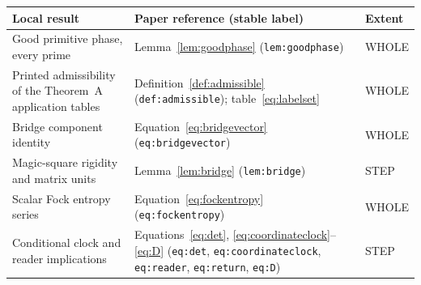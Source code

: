 \begin{center}\footnotesize
{}\label{tab:leancore}
\begin{tabular}{@{}>{\raggedright\arraybackslash}p{.36\linewidth}>{\raggedright\arraybackslash}p{.49\linewidth}>{\raggedright\arraybackslash}p{.09\linewidth}@{}}
\toprule Local result & Paper reference (stable label) & Extent\\\midrule
Good primitive phase, every prime & Lemma~\ref{lem:goodphase} (\texttt{lem:goodphase}) & WHOLE\\
Printed admissibility of the Theorem~A application tables & Definition~\ref{def:admissible} (\texttt{def:admissible}); table~\eqref{eq:labelset} & WHOLE\\
Bridge component identity & Equation~\eqref{eq:bridgevector} (\texttt{eq:bridgevector}) & WHOLE\\
Magic-square rigidity and matrix units & Lemma~\ref{lem:bridge} (\texttt{lem:bridge}) & STEP\\
Scalar Fock entropy series & Equation~\eqref{eq:fockentropy} (\texttt{eq:fockentropy}) & WHOLE\\
Conditional clock and reader implications & Equations~\eqref{eq:det}, \eqref{eq:coordinateclock}--\eqref{eq:D} (\texttt{eq:det}, \texttt{eq:coordinateclock}, \texttt{eq:reader}, \texttt{eq:return}, \texttt{eq:D}) & STEP\\
\bottomrule
\end{tabular}
\end{center}

